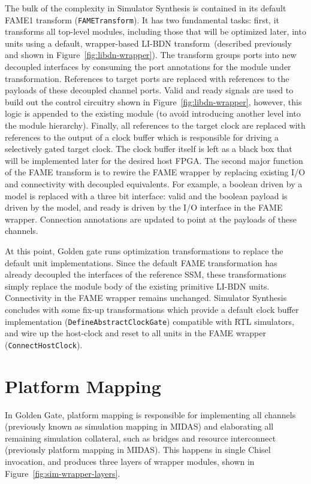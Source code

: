 The bulk of the complexity in Simulator Synthesis is contained in its default
FAME1 transform (\texttt{FAMETransform}). It has two fundamental tasks: first, it
transforms all top-level modules, including those that will be optimized later,
into units using a default, wrapper-based LI-BDN transform~(described
previously and shown in Figure~\ref{fig:libdn-wrapper}). The transform groups
ports into new decoupled interfaces by consuming the port annotations for the module under transformation.
References to target ports are replaced with references to the payloads
of these decoupled channel ports. Valid and ready signals are used to build out the
control circuitry shown in Figure~\ref{fig:libdn-wrapper}, however,
this logic is appended to the existing module (to avoid introducing another
level into the module hierarchy). Finally, all references to the target clock
are replaced with references to the output of a clock buffer which is responsible for driving a selectively
gated target clock.  The clock
buffer itself is left as a black box that will be implemented later for the
desired host FPGA.  The second major function of the FAME transform is to
rewire the FAME wrapper by replacing existing I/O and connectivity with decoupled
equivalents. For example, a boolean driven by a model is replaced with a three
bit interface: valid and the boolean payload is driven by the model, and ready
is driven by the I/O interface in the FAME wrapper. Connection annotations are
updated to point at the payloads of these channels.

At this point, Golden gate runs optimization transformations to replace the
default unit implementations. Since the default FAME
transformation has already decoupled the interfaces of the reference SSM, these
transformations simply replace the module body of the existing primitive LI-BDN units.
Connectivity in the FAME wrapper remains unchanged.  Simulator Synthesis
concludes with some fix-up transformations which provide a default clock buffer
implementation (\texttt{DefineAbstractClockGate}) compatible with RTL
simulators, and wire up the host-clock and reset to all units in the FAME
wrapper (\texttt{ConnectHostClock}).

\section{Platform Mapping}\label{sec:gg-platform-mapping}

In Golden Gate, platform mapping is responsible for implementing all
channels (previously known as simulation mapping in MIDAS) and elaborating
all remaining simulation collateral, such as bridges and resource interconnect
(previously platform mapping in MIDAS). This happens in single Chisel
invocation, and produces three layers of wrapper modules, shown in Figure~\ref{fig:sim-wrapper-layers}.

